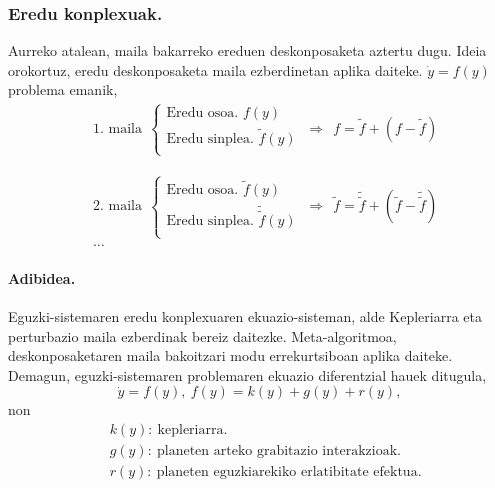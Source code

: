 \subsubsection*{Eredu konplexuak.}
Aurreko atalean, maila bakarreko ereduen deskonposaketa aztertu dugu. Ideia orokortuz, eredu deskonposaketa maila ezberdinetan aplika daiteke.  $\dot{y} =f(y)$ problema emanik, 
\begin{align*}
&\mbox{1. maila} \ \
\left \{ \begin{array}{c}
  \mbox{Eredu osoa.   } f(y) \\[.25cm]
  \mbox{Eredu sinplea.    } \tilde{f}(y)  \\
\end{array} \right.
\ \Rightarrow \ \
f =\tilde{f}+(f-\tilde{f})  
\end{align*}

\begin{align*}
&\mbox{2. maila} \ \
\left \{ \begin{array}{c}
  \mbox{Eredu osoa.   }\tilde{f}(y) \\[.25cm]
  \mbox{Eredu sinplea.    }\tilde{\tilde{f}}(y)  \\
\end{array} \right.
\ \Rightarrow \ \
\tilde{f} =\tilde{\tilde{f}}+({\tilde{f}}-\tilde{\tilde{f}})\\
&\dots  
\end{align*}

\paragraph*{Adibidea.}
Eguzki-sistemaren eredu konplexuaren ekuazio-sisteman, alde Kepleriarra eta perturbazio maila ezberdinak bereiz daitezke. Meta-algoritmoa, deskonposaketaren maila bakoitzari modu errekurtsiboan aplika daiteke. Demagun, eguzki-sistemaren problemaren ekuazio diferentzial hauek ditugula,
\begin{equation*}
\dot{y}=f(y), \ f(y)=k(y)+g(y)+r(y),
\end{equation*}
non
\begin{align*}
&k(y): \ \text{kepleriarra.}\\
&g(y): \ \text{planeten arteko grabitazio interakzioak.}\\
&r(y): \ \text{planeten eguzkiarekiko erlatibitate efektua.}
\end{align*}

